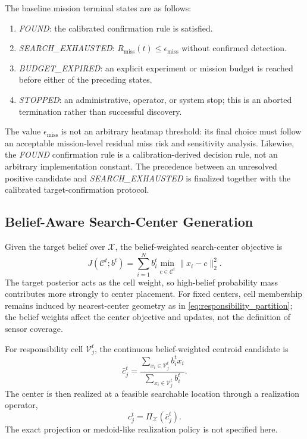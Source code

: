 \documentclass[letterpaper, 10pt, conference]{ieeeconf}
\begin{document}
The baseline mission terminal states are as follows:
\begin{enumerate}
  \item \emph{FOUND}: the calibrated confirmation rule is satisfied.
  \item \emph{SEARCH\_EXHAUSTED}: \(R_{\mathrm{miss}}(t)\leq\epsilon_{\mathrm{miss}}\) without confirmed detection.
  \item \emph{BUDGET\_EXPIRED}: an explicit experiment or mission budget is reached before either of the preceding states.
  \item \emph{STOPPED}: an administrative, operator, or system stop; this is an aborted termination rather than successful discovery.
\end{enumerate}
The value \(\epsilon_{\mathrm{miss}}\) is not an arbitrary heatmap threshold: its final choice must follow an acceptable mission-level residual miss risk and sensitivity analysis. Likewise, the \emph{FOUND} confirmation rule is a calibration-derived decision rule, not an arbitrary implementation constant.
The precedence between an unresolved positive candidate and \emph{SEARCH\_EXHAUSTED} is finalized together with the calibrated target-confirmation protocol.

\subsection{Belief-Aware Search-Center Generation}

Given the target belief over \(\mathcal{X}\), the belief-weighted search-center objective is
\begin{equation}
  J(\mathcal{C}^t;b^t) =
  \sum_{i=1}^{N} b_i^t
  \min_{c\in\mathcal{C}^t}\lVert x_i-c\rVert_2^2.
  \label{eq:belief_center_objective}
\end{equation}
The target posterior acts as the cell weight, so high-belief probability mass contributes more strongly to center placement. For fixed centers, cell membership remains induced by nearest-center geometry as in \eqref{eq:responsibility_partition}; the belief weights affect the center objective and updates, not the definition of sensor coverage.

For responsibility cell \(\mathcal{V}_j^t\), the continuous belief-weighted centroid candidate is
\begin{equation}
  \bar{c}_j^t =
  \frac{\sum_{x_i\in\mathcal{V}_j^t} b_i^t x_i}
  {\sum_{x_i\in\mathcal{V}_j^t} b_i^t}.
  \label{eq:belief_weighted_centroid}
\end{equation}
The center is then realized at a feasible searchable location through a realization operator,
\begin{equation}
  c_j^t = \Pi_{\mathcal{X}}\!\left(\bar{c}_j^t\right).
  \label{eq:feasible_center_realization}
\end{equation}
The exact projection or medoid-like realization policy is not specified here.
\end{document}
